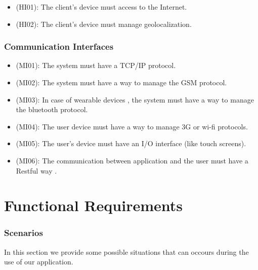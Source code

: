 \documentclass[a4paper,leqno]{book}
\begin{document}
\begin{itemize}
\item (HI01): The client's device must access to the Internet.
\item (HI02): The client's device must manage geolocalization. 
\end{itemize}

\section{Communication Interfaces}

\begin{itemize}
\item (MI01): The system must have a TCP/IP protocol.
\item (MI02): The system must have a way to manage the GSM protocol.
\item (MI03): In case of wearable devices , the system must have a way to manage the bluetooth protocol.
\item (MI04): The user device must have a way to manage 3G or wi-fi protocols.
\item (MI05): The user's device must have an I/O interface (like touch screens).
\item (MI06): The communication between application and the user must have a Restful way .
\end{itemize}

\part{Functional Requirements}

\section{Scenarios}
In this section we provide some possible situations that can occours during the use of our application.
\end{document}
